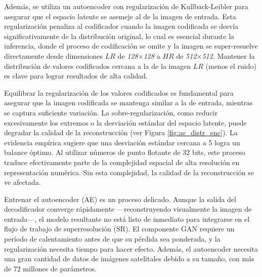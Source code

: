 Además, se utiliza un autoencoder con regularización de Kullback-Leibler para asegurar que el espacio latente se asemeje al de la imagen de entrada. Esta regularización penaliza al codificador cuando la imagen codificada se desvía significativamente de la distribución original, lo cual es esencial durante la inferencia, donde el proceso de codificación se omite y la imagen se super-resuelve directamente desde dimensiones $LR$ de \textit{128$\times$128} a $HR$ de \textit{512$\times$512}. Mantener la distribución de valores codificados cercana a la de la imagen $LR$ (menos el ruido) es clave para lograr resultados de alta calidad.

Equilibrar la regularización de los valores codificados es fundamental para asegurar que la imagen codificada se mantenga similar a la de entrada, mientras se captura suficiente variación. La sobre-regularización, como reducir excesivamente los extremos o la desviación estándar del espacio latente, puede degradar la calidad de la reconstrucción (ver Figura \ref{fig:ae_distr_enc}). La evidencia empírica sugiere que una desviación estándar cercana a 5 logra un balance óptimo. Al utilizar números de punto flotante de 32 bits, este proceso traduce efectivamente parte de la complejidad espacial de alta resolución en representación numérica. Sin esta complejidad, la calidad de la reconstrucción se ve afectada.

Entrenar el autoencoder (AE) es un proceso delicado. Aunque la salida del decodificador converge rápidamente —reconstruyendo visualmente la imagen de entrada—, el modelo resultante no está listo de inmediato para integrarse en el flujo de trabajo de superresolución (SR). El componente GAN requiere un período de calentamiento antes de que su pérdida sea ponderada, y la regularización necesita tiempo para hacer efecto. Además, el autoencoder necesita una gran cantidad de datos de imágenes satelitales debido a su tamaño, con más de 72 millones de parámetros.

